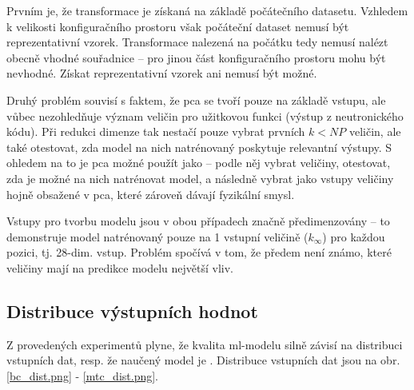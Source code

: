 Prvním je, že transformace je získaná na základě počátečního datasetu. Vzhledem k velikosti konfiguračního prostoru však počáteční dataset nemusí 
být reprezentativní vzorek. Transformace nalezená na počátku tedy nemusí nalézt obecně vhodné souřadnice -- pro jinou část konfiguračního prostoru 
mohu být nevhodné. Získat reprezentativní vzorek ani nemusí být možné. 

Druhý problém souvisí s faktem, že \ac{pca} se tvoří pouze na základě vstupu, ale vůbec nezohledňuje význam veličin pro užitkovou funkci (výstup z neutronického 
kódu). 
Při redukci dimenze tak nestačí pouze vybrat prvních $k<NP$ veličin, ale také otestovat, zda model na nich natrénovaný poskytuje relevantní výstupy. 
S ohledem na to je \ac{pca} možné použít jako  -- podle něj vybrat veličiny, otestovat, zda je možné na nich natrénovat model, a následně 
vybrat jako vstupy veličiny hojně obsažené v \ac{pca}, které zároveň dávají fyzikální smysl. 

Vstupy pro tvorbu modelu jsou v obou případech značně předimenzovány -- to demonstruje model natrénovaný pouze na 1 vstupní veličině ($k_{\infty}$) pro každou 
pozici, tj. 28-dim. vstup. Problém spočívá v tom, že předem není známo, které veličiny mají na predikce modelu největší vliv.

\subsection{Distribuce výstupních hodnot}
Z provedených experimentů plyne, že kvalita \ac{ml}-modelu silně závisí na distribuci vstupních dat, resp. že naučený model je . Distribuce 
vstupních dat jsou na obr. \ref{bc_dist.png} - \ref{mtc_dist.png}. 

